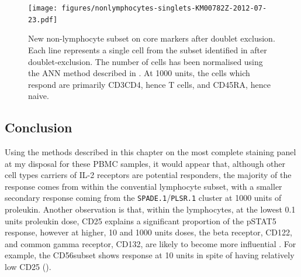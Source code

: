\begin{figure}
\begin{minipage}{.65\textwidth}
    \texttt{[image: figures/nonlymphocytes-singlets-KM00782Z-2012-07-23.pdf]}
\end{minipage}
\begin{minipage}{.3\textwidth}
{ New non-lymphocyte subset on core markers after doublet exclusion. } 
{
Each line represents a single cell from the subset identified in  after doublet-exclusion.
The number of cells has been normalised using the \gls{ANN} method described in .
At 1000 units, the cells which respond are primarily CD3\positive CD4\positive, hence T cells, and CD45RA\positive, hence naive.
}
\end{minipage}
\end{figure}

\subsection{Conclusion}

Using the methods described in this chapter on the most complete staining panel at my disposal for these \gls{PBMC} samples, it would appear that, although other cell types carriers of IL-2 receptors are potential responders, the majority of the response comes from within the convential lymphocyte subset, with a smaller secondary response coming from the \texttt{SPADE.1}/\texttt{PLSR.1} cluster at 1000 units of proleukin.
Another observation is that, within the lymphocytes, at the lowest 0.1 units proleukin dose, CD25 explains a significant proportion of the pSTAT5 response, however at higher, 10 and 1000 units doses, the beta receptor, CD122, and common gamma receptor, CD132, are likely to become more influential \citep{Pekalski:2013ga}.
For example, the CD56\high subset
shows response at 10 units in spite of having relatively low CD25 ().

